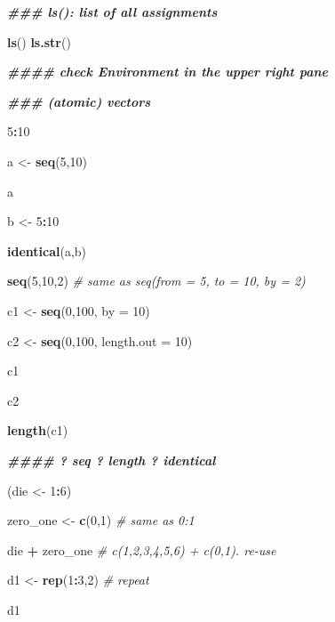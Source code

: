 \documentclass[
  xelatex, ja=standard]{bxjsbook}
\newenvironment{Shaded}{\begin{snugshade}}{\end{snugshade}}
\newcommand{\AttributeTok}[1]{\textcolor[rgb]{0.13,0.29,0.53}{#1}}
\newcommand{\CommentTok}[1]{\textcolor[rgb]{0.56,0.35,0.01}{\textit{#1}}}
\newcommand{\DecValTok}[1]{\textcolor[rgb]{0.00,0.00,0.81}{#1}}
\newcommand{\DocumentationTok}[1]{\textcolor[rgb]{0.56,0.35,0.01}{\textbf{\textit{#1}}}}
\newcommand{\FunctionTok}[1]{\textcolor[rgb]{0.13,0.29,0.53}{\textbf{#1}}}
\newcommand{\NormalTok}[1]{#1}
\newcommand{\OtherTok}[1]{\textcolor[rgb]{0.56,0.35,0.01}{#1}}
\newcommand{\SpecialCharTok}[1]{\textcolor[rgb]{0.81,0.36,0.00}{\textbf{#1}}}
\theoremstyle{definition}
\theoremstyle{definition}
\theoremstyle{definition}
\theoremstyle{definition}
\theoremstyle{remark}
\begin{document}
\begin{Shaded}
\begin{Highlighting}[]
\DocumentationTok{\#\#\# ls(): list of all assignments}

\FunctionTok{ls}\NormalTok{()}
\FunctionTok{ls.str}\NormalTok{()}

\DocumentationTok{\#\#\#\# check Environment in the upper right pane}

\DocumentationTok{\#\#\# (atomic) vectors}

\DecValTok{5}\SpecialCharTok{:}\DecValTok{10}

\NormalTok{a }\OtherTok{\textless{}{-}} \FunctionTok{seq}\NormalTok{(}\DecValTok{5}\NormalTok{,}\DecValTok{10}\NormalTok{)}

\NormalTok{a}

\NormalTok{b }\OtherTok{\textless{}{-}} \DecValTok{5}\SpecialCharTok{:}\DecValTok{10}

\FunctionTok{identical}\NormalTok{(a,b)}

\FunctionTok{seq}\NormalTok{(}\DecValTok{5}\NormalTok{,}\DecValTok{10}\NormalTok{,}\DecValTok{2}\NormalTok{) }\CommentTok{\# same as seq(from = 5, to = 10, by = 2)}

\NormalTok{c1 }\OtherTok{\textless{}{-}} \FunctionTok{seq}\NormalTok{(}\DecValTok{0}\NormalTok{,}\DecValTok{100}\NormalTok{, }\AttributeTok{by =} \DecValTok{10}\NormalTok{)}

\NormalTok{c2 }\OtherTok{\textless{}{-}} \FunctionTok{seq}\NormalTok{(}\DecValTok{0}\NormalTok{,}\DecValTok{100}\NormalTok{, }\AttributeTok{length.out =} \DecValTok{10}\NormalTok{)}

\NormalTok{c1}

\NormalTok{c2}

\FunctionTok{length}\NormalTok{(c1)}

\DocumentationTok{\#\#\#\# ? seq   ? length   ? identical}

\NormalTok{(die }\OtherTok{\textless{}{-}} \DecValTok{1}\SpecialCharTok{:}\DecValTok{6}\NormalTok{)}

\NormalTok{zero\_one }\OtherTok{\textless{}{-}} \FunctionTok{c}\NormalTok{(}\DecValTok{0}\NormalTok{,}\DecValTok{1}\NormalTok{) }\CommentTok{\# same as 0:1}

\NormalTok{die }\SpecialCharTok{+}\NormalTok{ zero\_one }\CommentTok{\# c(1,2,3,4,5,6) + c(0,1). re{-}use}

\NormalTok{d1 }\OtherTok{\textless{}{-}} \FunctionTok{rep}\NormalTok{(}\DecValTok{1}\SpecialCharTok{:}\DecValTok{3}\NormalTok{,}\DecValTok{2}\NormalTok{) }\CommentTok{\# repeat}


\NormalTok{d1}


\end{Highlighting}
\end{Shaded}
\end{document}
